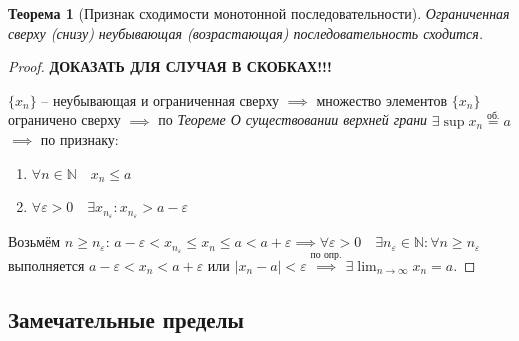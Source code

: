\documentclass[a4paper,oneside]{article}
\newcommand{\bydef}{\stackrel{\text{по опр.}}{\implies}} %
\newcommand{\dslim}{\displaystyle\lim}
\newcommand{\dslimn}{\dslim_{n \to \infty}}
\newtheorem{theorem}{Теорема}[subsection]
\theoremstyle{definition}
\theoremstyle{definition}
\theoremstyle{definition}
\begin{document}
\begin{theorem}[Признак сходимости монотонной последовательности]
    Ограниченная сверху (снизу) неубывающая (возрастающая) последовательность сходится.
\end{theorem}

\begin{proof}
    \textbf{ДОКАЗАТЬ ДЛЯ СЛУЧАЯ В СКОБКАХ!!!}

    $\{x_n\}$ -- неубывающая и ограниченная сверху $\implies$ множество элементов
    $\{x_n\}$ ограничено сверху $\implies$ по
    \textit{Теореме О существовании верхней грани} 
    $\exists \sup x_n \stackrel{\text{об.}}{=} a$ $\implies$ по признаку:
    \begin{enumerate}
        \item $\forall n \in \mathbb{N} \quad x_n \le a$
        \item $\forall \varepsilon > 0 \quad 
        \exists x_{n_\varepsilon} : x_{n_\varepsilon} > a - \varepsilon$
    \end{enumerate}
    
    Возьмём $n \ge n_\varepsilon$: 
    $a - \varepsilon < x_{n_\varepsilon} \le x_n \le a < a + \varepsilon
    \implies \forall \varepsilon > 0 \quad \exists n_\varepsilon \in \mathbb{N}:
    \forall n \ge n_\varepsilon$ выполняется $a - \varepsilon < x_n < a + \varepsilon$
    или $|x_n - a| < \varepsilon \bydef \exists \dslimn x_n = a$.
\end{proof}

\subsection{Замечательные пределы}
\end{document}
